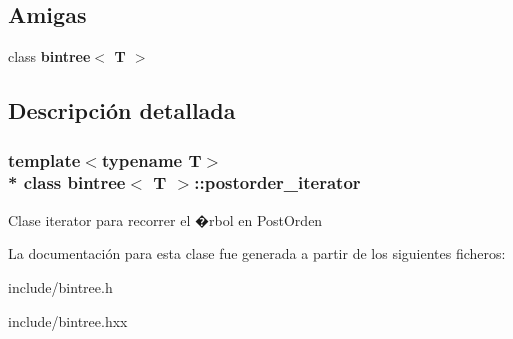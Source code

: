 \subsection*{Amigas}
\begin{DoxyCompactItemize}
\item 
class {\bfseries bintree$<$ T $>$}\hypertarget{classbintree_1_1postorder__iterator_a300e602ae13bd21fa092c5a5899e9eda}{}\label{classbintree_1_1postorder__iterator_a300e602ae13bd21fa092c5a5899e9eda}

\end{DoxyCompactItemize}


\subsection{Descripción detallada}
\subsubsection*{template$<$typename T$>$\\*
class bintree$<$ T $>$\+::postorder\+\_\+iterator}

Clase iterator para recorrer el �rbol en Post\+Orden 

La documentación para esta clase fue generada a partir de los siguientes ficheros\+:\begin{DoxyCompactItemize}
\item 
include/bintree.\+h\item 
include/bintree.\+hxx\end{DoxyCompactItemize}
